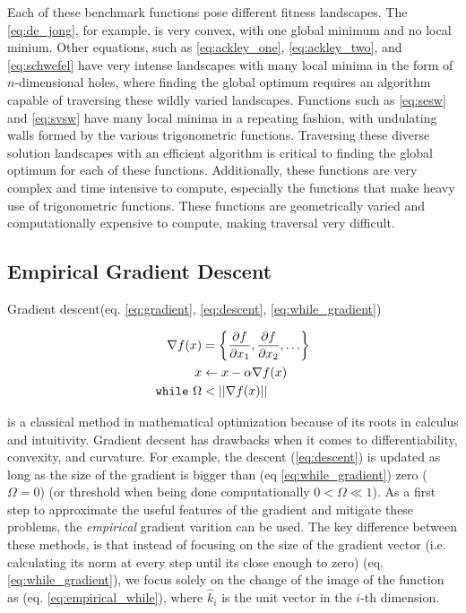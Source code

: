 \documentclass{article}
\begin{document}
Each of these benchmark functions pose different fitness landscapes. The \ref{eq:de_jong}, for example, is very convex, with one global minimum and no local minium. Other equations, such as \ref{eq:ackley_one}, \ref{eq:ackley_two}, and \ref{eq:schwefel} have very intense landscapes with many local minima in the form of $n$-dimensional holes, where finding the global optimum requires an algorithm capable of traversing these wildly varied landscapes. Functions such as \ref{eq:sesw} and \ref{eq:svsw} have many local minima in a repeating fashion, with undulating walls formed by the various trigonometric functions. Traversing these diverse solution landscapes with an efficient algorithm is critical to finding the global optimum for each of these functions. Additionally, these functions are very complex and time intensive to compute, especially the functions that make heavy use of trigonometric functions. These functions are geometrically varied and computationally expensive to compute, making traversal very difficult.
        \subsection{Empirical Gradient Descent}

            Gradient descent(eq. \ref{eq:gradient}, \ref{eq:descent}, \ref{eq:while_gradient})
            
            \begin{align}
                \label{eq:gradient} \nabla f(x) &= \left\{ \frac{\partial f}{\partial x_1}, \frac{\partial f}{\partial x_2}, \ldots\right\} \\
                \label{eq:descent} x &\leftarrow x - \alpha \nabla f(x) \\
                \label{eq:while_gradient} \text{\texttt{while} } \Omega &< ||\nabla f(x)||
            \end{align}
            
            is a classical method in mathematical optimization because of its roots in calculus and intuitivity.  Gradient decsent has drawbacks when it comes to differentiability,  convexity, and curvature.  For example, the descent (\ref{eq:descent}) is updated as long as the size of the gradient is bigger than (eq \ref{eq:while_gradient}) zero ($\Omega = 0$) (or threshold when being done computationally $0 < \Omega \ll 1$).  As a first step to approximate the useful features of the gradient and mitigate these problems, the \emph{empirical} gradient varition can be used.  The key difference between these methods, is that instead of focusing on the size of the gradient vector (i.e. calculating its norm at every step until its close enough to zero) (eq. \ref{eq:while_gradient}), we focus solely on the change of the image of the function as (eq. \ref{eq:empirical_while}), where $\hat{k}_i$ is the unit vector in the $i$-th dimension.
\end{document}
